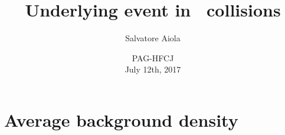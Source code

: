 \documentclass[xcolor={usenames,dvipsnames}]{beamer}
\title[Underlying event in \pp] %
{Underlying event in \pp\ collisions}
\author[Salvatore Aiola]%
{Salvatore Aiola}
\institute[Yale University] %
{Yale University}
\date[PAG-HFCJ - July 12th, 2017] %
{PAG-HFCJ \\
July 12th, 2017}
\begin{document}
\begin{frame}
  \titlepage
\end{frame}







\section{Average background density}
\end{document}
